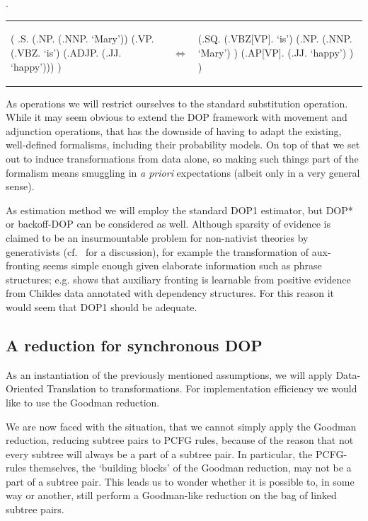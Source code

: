 \documentclass[a4paper]{article}
\theoremstyle{definition}
\begin{document}
\ex. \label{maryhappyann}

\begin{tabular}{lll}
\begin{parsetree}
( .S.
    (.NP. (.NNP. `Mary'))
    (.VP. (.VBZ. `is')
      (.ADJP. (.JJ. `happy')))
)
\end{parsetree}
& $\iff$ &
\begin{parsetree}
  (.SQ.
    (.VBZ[VP]. `is')
    (.NP. 
	(.NNP. `Mary') )
    (.AP[VP]. (.JJ. `happy') )
    )
\end{parsetree}
\end{tabular}
\vspace{1em}

As operations we will restrict ourselves to the standard substitution operation. While
it may seem obvious to extend the DOP framework with movement and adjunction operations,
that has the downside of having to adapt the existing, well-defined formalisms,
including their probability models. On top of that we set out to induce transformations
from data alone, so making such things part of the formalism means smuggling in
{\em a priori} expectations (albeit only in a very general sense).

As estimation method we will employ the standard DOP1 estimator, but DOP*
\citep{zollmann2005consistent} or backoff-DOP \citep{sima2003backoff, prescher2004statistical} can be considered as well. Although sparsity of
evidence is claimed to be an insurmountable problem for non-nativist theories
by generativists (cf.\ \citet{macwhinney2004multiple} for a discussion), for
example the transformation of aux-fronting seems simple enough given elaborate
information such as phrase structures; e.g. \citet{bod2007linguistic} shows
that auxiliary fronting is learnable from positive evidence from Childes data
annotated with dependency structures.  For this reason it would seem that DOP1
should be adequate.

\subsection{A reduction for synchronous DOP}

As an instantiation of the previously mentioned assumptions, we will apply
Data-Oriented Translation to transformations. For implementation efficiency
we would like to use the Goodman reduction.

We are now faced with the situation, that we cannot simply apply the Goodman
reduction, reducing subtree pairs to PCFG rules, because of the reason that not
every subtree will always be a part of a subtree pair. In particular, the
PCFG-rules themselves, the `building blocks' of the Goodman reduction, may not
be a part of a subtree pair. This leads us to wonder whether it is possible to,
in some way or another, still perform a Goodman-like reduction on the bag of
linked subtree pairs.
\end{document}
